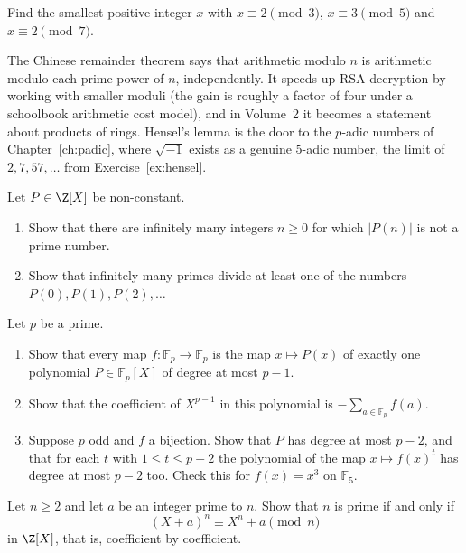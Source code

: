\begin{exercise}[$\star$]\label{ex:t1-sunzi23}
Find the smallest positive integer $x$ with $x\equiv 2\pmod 3$, $x\equiv 3\pmod 5$ and $x\equiv 2\pmod 7$.
\end{exercise}

\begin{beauty}
The Chinese remainder theorem says that arithmetic modulo $n$ is arithmetic modulo each prime power of $n$, independently. It speeds up RSA decryption by working with smaller moduli (the gain is roughly a factor of four under a schoolbook arithmetic cost model), and in Volume~2 it becomes a statement about products of rings. Hensel's lemma is the door to the $p$-adic numbers of Chapter~\ref{ch:padic}, where $\sqrt{-1}$ exists as a genuine $5$-adic number, the limit of $2,7,57,\dots$ from Exercise~\ref{ex:hensel}.
\end{beauty}

\begin{exercise}[$\star\star$]\label{pb:primepoly}
Let $P\in\Z[X]$ be non-constant.
\begin{enumerate}[label=(\alph*)]
\item Show that there are infinitely many integers $n\ge0$ for which $|P(n)|$ is not a prime number.
\item Show that infinitely many primes divide at least one of the numbers $P(0),P(1),P(2),\dots$
\end{enumerate}
\end{exercise}

\begin{exercise}[$\star\star$]\label{pb:fpfunctions}
Let $p$ be a prime.
\begin{enumerate}[label=(\alph*)]
\item Show that every map $f:\mathbb F_p\to\mathbb F_p$ is the map $x\mapsto P(x)$ of exactly one polynomial $P\in\mathbb F_p[X]$
of degree at most $p-1$.
\item Show that the coefficient of $X^{p-1}$ in this polynomial is $-\sum_{a\in\mathbb F_p}f(a)$.
\item Suppose $p$ odd and $f$ a bijection. Show that $P$ has degree at most $p-2$, and that for each $t$ with $1\le t\le p-2$
the polynomial of the map $x\mapsto f(x)^t$ has degree at most $p-2$ too. Check this for $f(x)=x^3$ on $\mathbb F_5$.
\end{enumerate}
\end{exercise}

\begin{exercise}[$\star\star$]\label{pb:aks}
Let $n\ge2$ and let $a$ be an integer prime to $n$. Show that $n$ is prime if and only if
\[
(X+a)^n\equiv X^n+a\pmod n
\]
in $\Z[X]$, that is, coefficient by coefficient.
\end{exercise}

